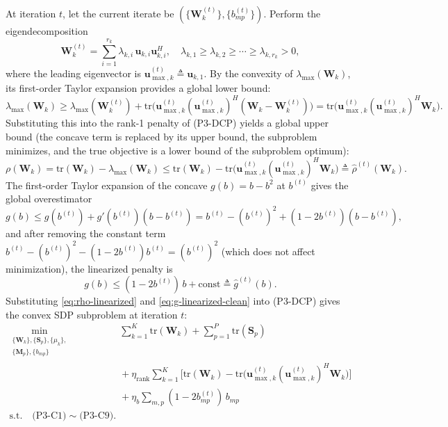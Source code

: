\documentclass[12pt,a4paper]{article}
\newcommand{\vect}[1]{\mathbf{#1}}
\newcommand{\mat}[1]{\mathbf{#1}}
\newcommand{\tr}{\text{tr}}
\begin{document}
At iteration $t$, let the current iterate be $(\{\mat{W}_k^{(t)}\}, \{b_{mp}^{(t)}\})$. Perform the eigendecomposition
\begin{equation}
\mat{W}_k^{(t)} = \sum_{i=1}^{r_k} \lambda_{k,i} \, \vect{u}_{k,i} \vect{u}_{k,i}^H, \quad \lambda_{k,1} \geq \lambda_{k,2} \geq \cdots \geq \lambda_{k,r_k} > 0,
\end{equation}
where the leading eigenvector is $\vect{u}_{\max,k}^{(t)} \triangleq \vect{u}_{k,1}$. By the convexity of $\lambda_{\max}(\mat{W}_k)$, its first-order Taylor expansion provides a global lower bound:
\begin{equation}\label{eq:lambda-lb}
\lambda_{\max}(\mat{W}_k) \geq \lambda_{\max}(\mat{W}_k^{(t)}) + \tr\Big( \vect{u}_{\max,k}^{(t)} (\vect{u}_{\max,k}^{(t)})^H (\mat{W}_k - \mat{W}_k^{(t)}) \Big) = \tr\Big( \vect{u}_{\max,k}^{(t)} (\vect{u}_{\max,k}^{(t)})^H \mat{W}_k \Big).
\end{equation}
Substituting this into the rank-1 penalty of (P3-DCP) yields a global upper bound (the concave term is replaced by its upper bound, the subproblem minimizes, and the true objective is a lower bound of the subproblem optimum):
\begin{equation}\label{eq:rho-linearized}
\rho(\mat{W}_k) = \tr(\mat{W}_k) - \lambda_{\max}(\mat{W}_k) \leq \tr(\mat{W}_k) - \tr\Big( \vect{u}_{\max,k}^{(t)} (\vect{u}_{\max,k}^{(t)})^H \mat{W}_k \Big) \triangleq \hat{\rho}^{(t)}(\mat{W}_k).
\end{equation}
The first-order Taylor expansion of the concave $g(b) = b - b^2$ at $b^{(t)}$ gives the global overestimator
\begin{equation}\label{eq:g-linearized}
g(b) \leq g(b^{(t)}) + g'(b^{(t)})(b - b^{(t)}) = b^{(t)} - (b^{(t)})^2 + (1 - 2b^{(t)})(b - b^{(t)}),
\end{equation}
and after removing the constant term $b^{(t)} - (b^{(t)})^2 - (1 - 2b^{(t)}) b^{(t)} = (b^{(t)})^2$ (which does not affect minimization), the linearized penalty is
\begin{equation}\label{eq:g-linearized-clean}
g(b) \leq (1 - 2b^{(t)}) \, b + \text{const} \triangleq \hat{g}^{(t)}(b).
\end{equation}
Substituting \eqref{eq:rho-linearized} and \eqref{eq:g-linearized-clean} into (P3-DCP) gives the convex SDP subproblem at iteration $t$:
\begin{equation}\label{eq:p3-sca}
\begin{aligned}
\min_{\substack{\{\mat{W}_k\}, \{\mat{S}_p\}, \{\mu_k\}, \\ \{\mat{M}_p\}, \{b_{mp}\}}} \quad
& \sum_{k=1}^K \tr(\mat{W}_k) + \sum_{p=1}^P \tr(\mat{S}_p) \\
& {}+ \eta_{\text{rank}} \sum_{k=1}^K \Big[ \tr(\mat{W}_k)
 - \tr\big(\vect{u}_{\max,k}^{(t)}(\vect{u}_{\max,k}^{(t)})^H\mat{W}_k\big) \Big] \\
& {}+ \eta_b \sum_{m,p}(1 - 2b_{mp}^{(t)})\,b_{mp} \\
\text{s.t.} \quad \text{(P3-C1)}\sim\text{(P3-C9)}.
\end{aligned}
\end{equation}
\end{document}
